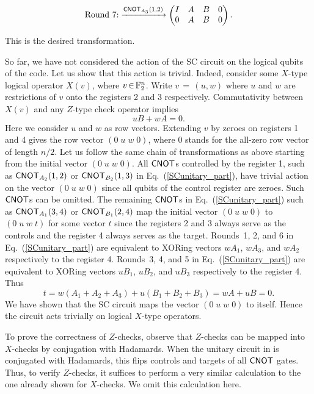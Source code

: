 \documentclass{article}
\begin{document}
\[
\text{Round~7:}
\xrightarrow{\mathsf{CNOT}_{A_3}(1,2)}
\begin{pmatrix}
I & A & B & 0 \\
0 & A & B & 0  \\
\end{pmatrix}.
\]

\noindent This is the desired transformation.

So far, we have not considered the action of the SC circuit on the logical qubits of the code.  Let us show that this action is trivial.  Indeed, consider some $X$-type logical operator $X(v)$, where $v\,{\in}\, \mathbb{F}_2^n$. Write $v\,{=}\,(u,w)$ where $u$ and $w$ are restrictions of $v$ onto the registers 2 and 3 respectively. Commutativity between $X(v)$ and any $Z$-type check operator implies 
\[
uB+wA=0.
\]
Here we consider $u$ and $w$ as row vectors.  Extending $v$ by zeroes on registers 1 and 4 gives the row vector $(0\; u \; w\; 0)$, where $0$ stands for the all-zero row vector of length $n/2$.  Let us follow the same chain of transformations as above starting from the initial vector $(0\; u \; w\; 0)$. All $\mathsf{CNOT}$s controlled by the register 1, such as $\mathsf{CNOT}_{A_2}(1,2)$ or $\mathsf{CNOT}_{B_2}(1,3)$ in Eq.~(\ref{SCunitary_part}), have trivial action on the vector $(0\; u \; w\; 0)$ since all qubits of the control register are zeroes.  Such $\mathsf{CNOT}$s can be omitted.  The remaining $\mathsf{CNOT}$s in Eq.~(\ref{SCunitary_part}) such as $\mathsf{CNOT}_{A_1}(3,4)$ or $\mathsf{CNOT}_{B_1}(2,4)$ map the initial vector $(0\; u \; w\; 0)$ to $(0\; u \; w\; t)$ for some vector $t$ since the registers 2 and 3 always serve as the controls and the register 4 always serves as the target.  Rounds~1, 2, and 6 in Eq.~(\ref{SCunitary_part})  are equivalent to XORing vectors $wA_1$, $wA_3$, and $wA_2$ respectively to the register 4.  Rounds~3, 4, and 5 in Eq.~(\ref{SCunitary_part}) are equivalent to XORing vectors $uB_1$, $uB_2$, and $uB_3$ respectively to the register 4.  Thus
\[
t = w(A_1{+}A_2{+}A_3) + u(B_1{+}B_2{+}B_3) = wA + uB = 0.
\]
We have shown that the SC circuit maps the vector  $(0\; u \; w\; 0)$ to itself. Hence the circuit acts trivially on logical $X$-type operators. 

To prove the correctness of $Z$-checks, observe that $Z$-checks can be mapped into $X$-checks by conjugation with Hadamards.  When the unitary circuit in  is conjugated with Hadamards, this flips controls and targets of all $\mathsf{CNOT}$ gates.  Thus, to verify $Z$-checks, it suffices to perform a very similar calculation to the one already shown for $X$-checks.  We omit this calculation here.
\end{document}
